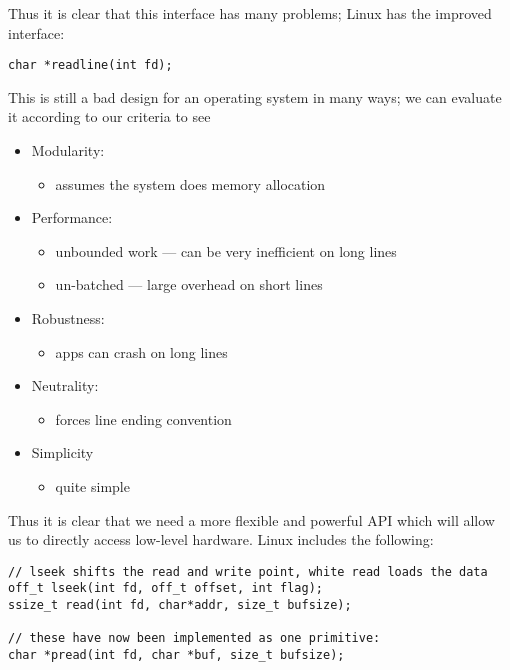 \documentclass[../../lecture_notes.tex]{subfiles}
\begin{document}
Thus it is clear that this interface has many problems; Linux has the improved interface:
\begin{lstlisting}
char *readline(int fd);
\end{lstlisting}
This is still a bad design for an operating system in many ways; we can evaluate it according to our criteria to see
\begin{itemize}[nosep]
\item Modularity:
	\begin{itemize}
	\item assumes the system does memory allocation
	\end{itemize}
\item Performance:
	\begin{itemize}
	\item unbounded work --- can be very inefficient on long lines
	\item un-batched --- large overhead on short lines
	\end{itemize}
\item Robustness:
	\begin{itemize}
	\item apps can crash on long lines
	\end{itemize}
\item Neutrality:
	\begin{itemize}
	\item forces line ending convention
	\end{itemize}
\item Simplicity
	\begin{itemize}
	\item quite simple
	\end{itemize}
\end{itemize}


Thus it is clear that we need a more flexible and powerful API which will allow us to directly access low-level hardware. Linux includes the following:
\begin{lstlisting}
// lseek shifts the read and write point, white read loads the data
off_t lseek(int fd, off_t offset, int flag);
ssize_t read(int fd, char*addr, size_t bufsize);

// these have now been implemented as one primitive:
char *pread(int fd, char *buf, size_t bufsize);
\end{lstlisting}
\end{document}
